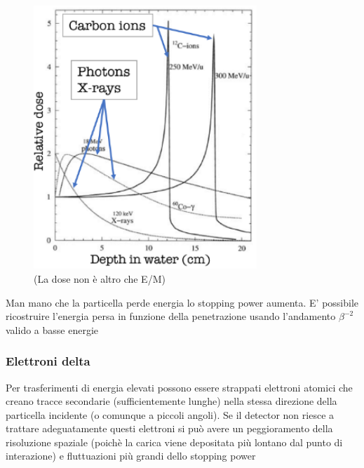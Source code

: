 \begin{minipage}{0.55\textwidth}
    \begin{figure}[H]
        \centering
        \includegraphics[width=0.75\textwidth,frame]{Chapters/images/Interazione_radiazione_materia/image-20220214183616196.png}
        \captionsetup{width=\textwidth}
        \caption{(La dose non è altro che E/M)}
        \label{fig:braggpeak}
    \end{figure}
\end{minipage} \hfill
\begin{minipage}{0.48\textwidth}
    Man mano che la particella perde energia lo stopping power aumenta. E' possibile ricostruire l'energia persa in funzione della penetrazione usando l'andamento $\beta^{-2}$ valido a basse energie

\end{minipage}

\subsubsection*{Elettroni delta}
Per trasferimenti di energia elevati possono essere strappati elettroni atomici che creano tracce secondarie (sufficientemente lunghe) nella stessa direzione della particella incidente (o comunque a piccoli angoli).
Se il detector non riesce a trattare adeguatamente questi elettroni si può avere un peggioramento della risoluzione spaziale (poichè la carica viene depositata più lontano dal punto di interazione) e fluttuazioni più grandi dello stopping power

